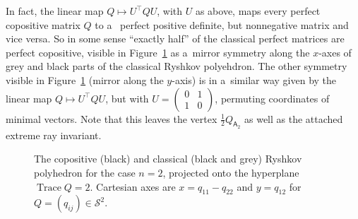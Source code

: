 \documentclass{commat}
\newcommand{\stwo}{{\mathcal{S}}^{2}}
\begin{document}
In fact, the linear map \(Q\mapsto U^\intercal QU \),
with $U$ as above, maps every perfect copositive matrix $Q$ to a~
perfect positive definite, but nonnegative matrix and vice versa.
So in some sense ``exactly half'' of the classical perfect matrices
are perfect copositive, visible in Figure~\ref{fig:rcop-2} as a~mirror symmetry
along the $x$-axes of grey and black parts of the classical Ryshkov polyehdron.
The other symmetry visible in Figure~\ref{fig:rcop-2} (mirror along the $y$-axis)
is in a~similar way given by the linear map \(Q\mapsto U^\intercal QU \),
but with \(U=
\begin{pmatrix}
0 & 1 \\ 1 & 0
\end{pmatrix}
\),
permuting coordinates of minimal vectors.
Note that this leaves the vertex \(\frac12 Q_{\mathsf{A}_2} \) as well as
the attached extreme ray invariant.

\begin{figure}
	\centering
	
	\caption{The copositive (black) and classical (black and grey) Ryshkov polyhedron for the case
		 \(n=2 \), projected onto the hyperplane \(\operatorname{Trace}Q=2 \).
    	Cartesian axes are \(x=q_{11}-q_{22} \) and \(y=q_{12} \) for \(Q=(q_{ij})\in\stwo \).
	}%
	\label{fig:rcop-2}
\end{figure}
\end{document}
